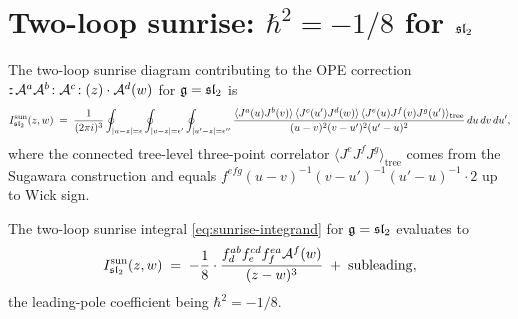 \section{Two-loop sunrise: $\hbar^2 = -1/8$ for $\mathfrak{sl}_2$}
\label{sec:ch-ce-twoloop-sunrise}

\begin{definition}
\label{def:sunrise-integrand}
%
The two-loop sunrise diagram contributing to the OPE correction
$:\!:\!\mathcal{A}^a\mathcal{A}^b\!:\mathcal{A}^c\!:(z)\cdot\mathcal{A}^d(w)$ for
$\mathfrak{g} = \mathfrak{sl}_2$ is
\begin{equation}
\label{eq:sunrise-integrand}
I^{\mathrm{sun}}_{\mathfrak{sl}_2}(z,w)
\;=\;
\frac{1}{(2\pi i)^3}
\oint_{|u-z|=\epsilon}
\oint_{|v-z|=\epsilon'}
\oint_{|u'-z|=\epsilon''}
\frac{\langle J^a(u)J^b(v)\rangle\,
\langle J^c(u')J^d(w)\rangle\,
\langle J^e(u)J^f(v)J^g(u')\rangle_{\mathrm{tree}}}
{(u-v)^2(v-u')^2(u'-u)^2}
\,du\,dv\,du',
\end{equation}
where the connected tree-level three-point correlator
$\langle J^e J^f J^g\rangle_{\mathrm{tree}}$ comes from the Sugawara
construction and equals
$f^{efg}(u-v)^{-1}(v-u')^{-1}(u'-u)^{-1}\cdot 2$ up to Wick sign.
\end{definition}

\begin{theorem}
\label{thm:ch-ce-sunrise-sl2-minus-eighth}
%
The two-loop sunrise integral \eqref{eq:sunrise-integrand} for
$\mathfrak{g} = \mathfrak{sl}_2$ evaluates to
\begin{equation}
\label{eq:sunrise-sl2-evaluation}
I^{\mathrm{sun}}_{\mathfrak{sl}_2}(z,w)
\;=\;
-\frac{1}{8}\cdot\frac{f^{ab}_d f^{cd}_e f^{ea}_f\mathcal{A}^f(w)}{(z-w)^3}
\;+\;
\mathrm{subleading},
\end{equation}
the leading-pole coefficient being $\hbar^2 = -1/8$.
\end{theorem}

